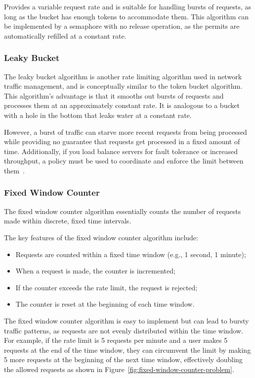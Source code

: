 Provides a variable request rate and is suitable for handling bursts of requests,
as long as the bucket has enough tokens to accommodate them.
This algorithm can be implemented by a semaphore with no release operation, as the permits are automatically refilled at a constant rate.

\subsubsection{Leaky Bucket}\label{subsubsec:leaky-bucket-algorithm}

The leaky bucket algorithm is another rate limiting algorithm used in network traffic management, and is conceptually similar to the token bucket algorithm.
This algorithm's advantage is that it smooths out bursts of requests
and processes them at an approximately constant rate. It is analogous to a bucket with a hole in the bottom that leaks water at a constant rate.

However,
a burst of traffic can starve more recent requests from being processed
while providing no guarantee that requests get processed in a fixed amount of time.
Additionally, if you load balance servers for fault tolerance or increased throughput, a policy must be used to coordinate and enforce the limit between them~\cite{kong-rate-limiting}.

\subsubsection{Fixed Window Counter}\label{subsubsec:fixed-window-counter-algorithm}

The fixed window counter algorithm essentially counts the number of requests made within discrete,
fixed time intervals.

The key features of the fixed window counter algorithm include:

\begin{itemize}
    \item Requests are counted within a fixed time window (e.g., 1 second, 1 minute);
    \item When a request is made, the counter is incremented;
    \item If the counter exceeds the rate limit, the request is rejected;
    \item The counter is reset at the beginning of each time window.
\end{itemize}

The fixed window counter algorithm is easy to implement but can lead to bursty traffic patterns, as requests are not evenly distributed within the time window.
For example, if the rate limit is 5 requests per minute and a user makes 5 requests at the end of the time window, they can circumvent the limit by making 5 more requests at the beginning of the next time window, effectively doubling the allowed requests as shown in Figure~\ref{fig:fixed-window-counter-problem}.

